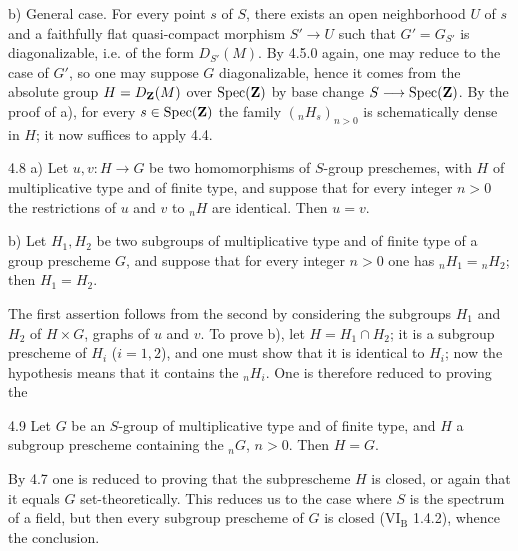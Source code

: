 b) General case. For every point $s$ of $S$, there exists an open neighborhood $U$ of $s$ and a faithfully flat quasi-compact morphism $S'\to U$ such that $G'=G_{S'}$ is diagonalizable, i.e. of the form $D_{S'}(M)$. By 4.5.0 again, one may reduce to the case of $G'$, so one may suppose $G$ diagonalizable, hence it comes from the absolute group $H=D_{\mathbf{Z}}(M)$ over $\operatorname{Spec}(\mathbf{Z})$ by base change $S\longrightarrow\operatorname{Spec}(\mathbf{Z})$. By the proof of a), for every $s\in\operatorname{Spec}(\mathbf{Z})$ the family $({}_nH_s)_{n>0}$ is schematically dense in $H$; it now suffices to apply 4.4.
\begin{corollary}{4.8}\label{IX.4.8}
a) Let $u,v:H\to G$ be two homomorphisms of $S$-group preschemes, with $H$ of multiplicative type and of finite type, and suppose that for every integer $n>0$ the restrictions of $u$ and $v$ to ${}_nH$ are identical. Then $u=v$.

b) Let $H_1,H_2$ be two subgroups of multiplicative type and of finite type of a group prescheme $G$, and suppose that for every integer $n>0$ one has ${}_nH_1={}_nH_2$; then $H_1=H_2$.
\end{corollary}
The first assertion follows from the second by considering the subgroups $H_1$ and $H_2$ of $H\times G$, graphs of $u$ and $v$. To prove b), let $H=H_1\cap H_2$; it is a subgroup prescheme of $H_i$ ($i=1,2$), and one must show that it is identical to $H_i$; now the hypothesis means that it contains the ${}_nH_i$. One is therefore reduced to proving the
\begin{corollary}{4.9}\label{IX.4.9}
Let $G$ be an $S$-group of multiplicative type and of finite type, and $H$ a subgroup prescheme containing the ${}_nG$, $n>0$. Then $H=G$.
\end{corollary}
By 4.7 one is reduced to proving that the subprescheme $H$ is closed, or again that it equals $G$ set-theoretically. This reduces us to the case where $S$ is the spectrum of a field, but then every subgroup prescheme of $G$ is closed (VI$_{\mathrm B}$ 1.4.2), whence the conclusion.
